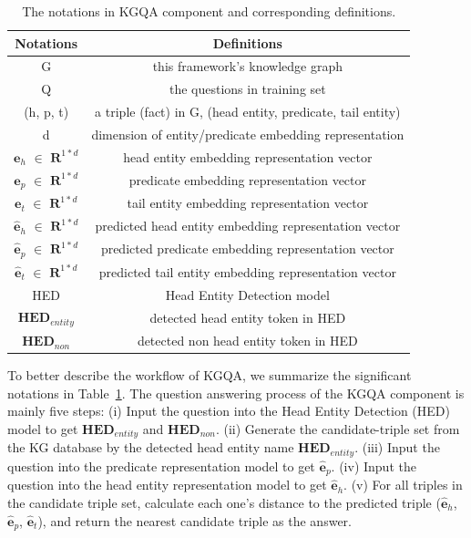 \documentclass[11pt]{article}
\begin{document}
\begin{table}[h!]
\footnotesize
\caption{The notations in KGQA component and corresponding definitions.}
\centering
\begin{tabular}{c c}
 \hline
 Notations & Definitions  \\ [0.2ex]
 \hline
 G & this framework's knowledge graph  \\
 Q & the questions in training set  \\
 (h, p, t) & a triple (fact) in G, (head entity, predicate, tail entity)  \\
 d & dimension of entity/predicate embedding representation  \\
 ${\mathbf{e}}_h$ $\in$ $ \mathbf{R}^{1*d}$ & head entity embedding representation vector  \\
 ${\mathbf{e}}_p$ $\in$ $ \mathbf{R}^{1*d}$ & predicate embedding representation vector  \\
 ${\mathbf{e}}_t$ $\in$ $ \mathbf{R}^{1*d}$ & tail entity embedding representation vector  \\
 $\hat{\mathbf{e}}_h$ $\in$ $ \mathbf{R}^{1*d}$ & predicted head entity embedding representation vector  \\
 $\hat{\mathbf{e}}_p$ $\in$ $ \mathbf{R}^{1*d}$ & predicted predicate embedding representation vector  \\
 $\hat{\mathbf{e}}_t$ $\in$ $ \mathbf{R}^{1*d}$ & predicted tail entity embedding representation vector  \\
 HED & Head Entity Detection model  \\
 ${\mathbf{HED}}_{entity}$ & detected head entity token in HED  \\
 ${\mathbf{HED}}_{non}$ & detected non head entity token in HED  \\
 \hline
\end{tabular}
\label{table:KGQA}
\end{table}

To better describe the workflow of KGQA, we summarize the significant notations in Table~\ref{table:KGQA}.
The question answering process of the KGQA component is mainly five steps: (i) Input the question into the Head Entity Detection (HED) model to get ${\mathbf{HED}}_{entity}$ and  ${\mathbf{HED}}_{non}$. (ii) Generate the candidate-triple set from the KG database by the detected head entity name ${\mathbf{HED}}_{entity}$. (iii) Input the question into the predicate representation model to get $\hat{\mathbf{e}}_{p}$. (iv) Input the question into the head entity representation model to get $\hat{\mathbf{e}}_{h}$. (v) For all triples in the candidate triple set, calculate each one's distance to the predicted triple ($\hat{\mathbf{e}}_{h}$, $\hat{\mathbf{e}}_{p}$, $\hat{\mathbf{e}}_{t}$), and return the nearest candidate triple as the answer.
\end{document}
